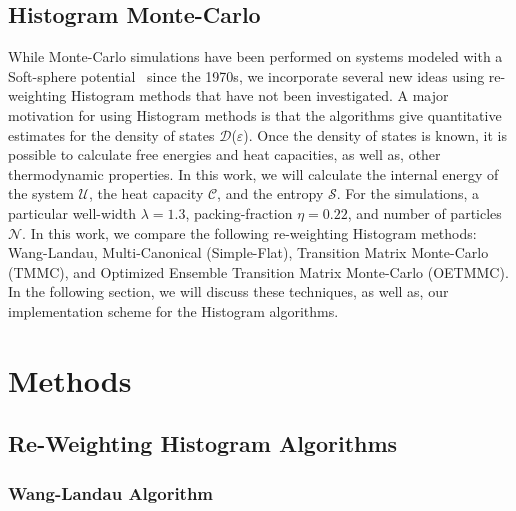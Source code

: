 \documentclass[letterpaper,twocolumn,amsmath,amssymb,pre,aps,10pt]{revtex4-1}
\begin{document}
\subsection{Histogram Monte-Carlo}

While Monte-Carlo simulations have been performed on systems modeled 
with a Soft-sphere potential~\cite{andersen1971relationship, 
hansen1970phase, sun2013efficient, ghoufi2016computer} since the 1970s, 
we incorporate several new ideas using re-weighting Histogram methods 
that have not been investigated.  A major motivation for using 
Histogram methods is that the algorithms give quantitative estimates 
for the density of states $\mathcal{D}$($\varepsilon$).  Once the 
density of states is known, it is possible to calculate free energies 
and heat capacities, as well as, other thermodynamic properties.  In 
this work, we will calculate the internal energy of the system 
$\mathcal{U}$, the heat capacity $\mathcal{C}$, and the entropy 
$\mathcal{S}$.  For the simulations, a particular well-width 
$\lambda=1.3$, packing-fraction $\eta=0.22$, and number of particles 
$\mathcal{N}$.  In this work, we compare the following re-weighting 
Histogram methods:  Wang-Landau, Multi-Canonical (Simple-Flat), 
Transition Matrix Monte-Carlo (TMMC), and Optimized Ensemble Transition 
Matrix Monte-Carlo (OETMMC).  In the following section, we will discuss 
these techniques, as well as, our implementation scheme for the 
Histogram algorithms.

\section{Methods}

\subsection{Re-Weighting Histogram Algorithms}

\subsubsection{Wang-Landau Algorithm}
\end{document}

